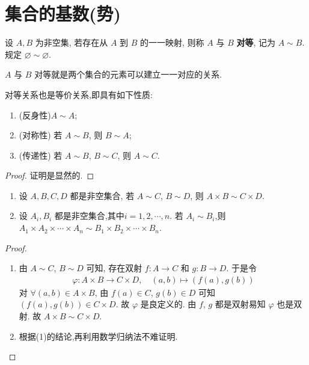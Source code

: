 \documentclass[../../main.tex]{subfiles}%
\begin{document}
\section{集合的基数(势)}

\begin{definition}[集合的对等]
设 $A, B$ 为非空集, 若存在从 $A$ 到 $B$ 的一一映射, 则称 $A$ 与 $B$ \textbf{对等}, 记为 $A \sim B$. 规定 $\varnothing \sim \varnothing$.
\end{definition}
\begin{note}
$A$ 与 $B$ 对等就是两个集合的元素可以建立一一对应的关系. 
\end{note}

\begin{theorem}\label{theorem:对等关系也是等价关系}
对等关系也是等价关系,即具有如下性质:
\begin{enumerate}[(1)]
\item (反身性)$A \sim A$;
\item (对称性) 若 $A \sim B$, 则 $B \sim A$;
\item (传递性) 若 $A \sim B$, $B \sim C$, 则 $A \sim C$.
\end{enumerate} 
\end{theorem}
\begin{proof}
证明是显然的.
\end{proof}

\begin{proposition}\label{proposition:对等集合的积也对等}
\begin{enumerate}[(1)]
\item 设 $A, B, C, D$ 都是非空集合, 若 $A \sim C$, $B \sim D$, 则 $A \times B \sim C \times D$.

\item 设 $A_i, B_i$ 都是非空集合,其中$i=1,2,\cdots,n$. 若 $A_i \sim B_i$,则 $A_1\times A_2\times \cdots \times A_n\sim B_1\times B_2\times \cdots \times B_n$.
\end{enumerate}
\end{proposition}
\begin{proof}
\begin{enumerate}[(1)]
\item 由 $A \sim C$, $B \sim D$ 可知, 存在双射 $f : A \rightarrow C$ 和 $g : B \rightarrow D$. 于是令
\begin{align*}
\varphi : A \times B \rightarrow C \times D, \quad (a, b) \mapsto (f(a), g(b))
\end{align*}
对 $\forall (a, b) \in A \times B$, 由 $f(a) \in C$, $g(b) \in D$ 可知 $(f(a), g(b)) \in C \times D$. 故 $\varphi$ 是良定义的. 由 $f$, $g$ 都是双射易知 $\varphi$ 也是双射. 故 $A \times B \sim C \times D$. 


\item 根据(1)的结论,再利用数学归纳法不难证明.
\end{enumerate}
\end{proof}
\end{document}
